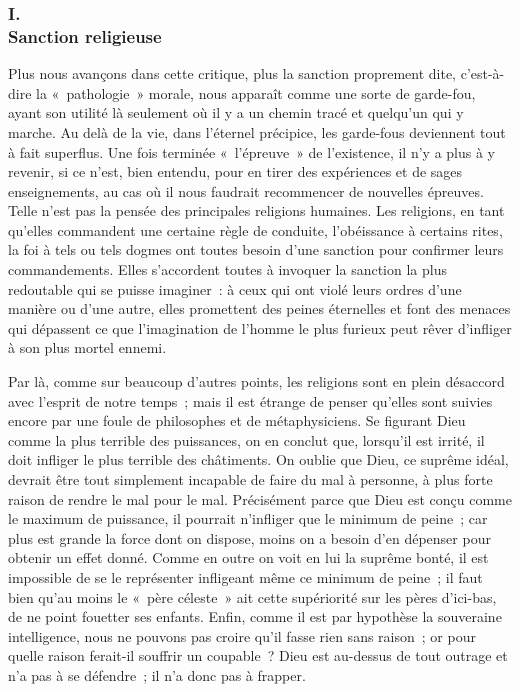 \documentclass[french,twoside]{book} %
\begin{document}
\subsubsection[{I. Sanction religieuse}]{I. \\
Sanction religieuse}
\noindent Plus nous avançons dans cette critique, plus la sanction proprement dite, c’est-à-dire la « pathologie » morale, nous apparaît comme une sorte de garde-fou, ayant son utilité là seulement où il y a un chemin tracé et quelqu’un qui y marche. Au delà de la vie, dans l’éternel précipice, les garde-fous deviennent tout à fait superflus. Une fois terminée « l’épreuve » de l’existence, il n’y a plus à y revenir, si ce n’est, bien entendu, pour en tirer des expériences et de sages enseignements, au cas où il nous faudrait recommencer de nouvelles épreuves. Telle n’est pas la pensée des principales religions humaines. Les religions, en tant qu’elles commandent une certaine règle de conduite, l’obéissance à certains rites, la foi à tels ou tels dogmes ont toutes besoin d’une sanction pour confirmer leurs commandements. Elles s’accordent toutes à invoquer la sanction la plus redoutable qui se puisse imaginer : à ceux qui ont violé leurs ordres d’une manière ou d’une autre, elles promettent des peines éternelles et font des menaces qui dépassent ce que l’imagination de l’homme le plus furieux peut rêver d’infliger à son plus mortel ennemi.\par
Par là, comme sur beaucoup d’autres points, les religions sont en plein désaccord avec l’esprit de notre temps ; mais il est étrange de penser qu’elles sont suivies encore par une foule de philosophes et de métaphysiciens. Se figurant Dieu comme la plus terrible des puissances, on en conclut que, lorsqu’il est irrité, il doit infliger le plus terrible des châtiments. On oublie que Dieu, ce suprême idéal, devrait être tout simplement incapable de faire du mal à personne, à plus forte raison de rendre le mal pour le mal. Précisément parce que Dieu est conçu comme le maximum de puissance, il pourrait n’infliger que le minimum de peine ; car plus est grande la force dont on dispose, moins on a besoin d’en dépenser pour obtenir un effet donné. Comme en outre on voit en lui la suprême bonté, il est impossible de se le représenter infligeant même ce minimum de peine ; il faut bien qu’au moins le « père céleste » ait cette supériorité sur les pères d’ici-bas, de ne point fouetter ses enfants. Enfin, comme il est par hypothèse la souveraine intelligence, nous ne pouvons pas croire qu’il fasse rien sans raison ; or pour quelle raison ferait-il souffrir un coupable ? Dieu est au-dessus de tout outrage et n’a pas à se défendre ; il n’a donc pas à frapper.\par
\end{document}
